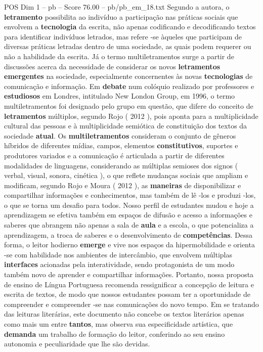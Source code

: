\begin{textsample}{POS Dim 1 – pb – Score 76.00 – pb/pb\_em\_18.txt}
Segundo a autora, o \textbf{letramento} possibilita ao indivíduo a participação nas práticas sociais que envolvem a \textbf{tecnologia} da escrita, não apenas codificando e decodificando textos para identificar indivíduos letrados, mas refere -se àqueles que participam de diversas práticas letradas dentro de uma sociedade, as quais podem requerer ou não a habilidade da escrita.
Já o termo multiletramentos surge a partir de discussões acerca da necessidade de considerar os novos \textbf{letramentos} \textbf{emergentes} na sociedade, especialmente concernentes às novas \textbf{tecnologias} de comunicação e informação.
Em \textbf{debate} num colóquio realizado por professores e \textbf{estudiosos} em Londres, intitulado New London Group, em 1996, o termo multiletramentos foi designado pelo grupo em questão, que difere do conceito de \textbf{letramentos} múltiplos, segundo Rojo ( 2012 ), pois aponta para a multiplicidade cultural das pessoas e à multiplicidade semiótica de constituição dos textos da sociedade \textbf{atual}.
Os \textbf{multiletramentos} consideram o conjunto de gêneros híbridos de diferentes mídias, campos, elementos \textbf{constitutivos}, suportes e produtores variados e a comunicação é articulada a partir de diferentes modalidades de linguagens, considerando as múltiplas semioses dos signos ( verbal, visual, sonora, cinética ), o que reflete mudanças sociais que ampliam e modificam, segundo Rojo e Moura ( 2012 ), as \textbf{maneiras} de disponibilizar e compartilhar informações e conhecimentos, mas também de lê -los e produzi -los, o que se torna um desafio para todos.
Nosso perfil de estudantes mudou e hoje a aprendizagem se efetiva também em espaços de difusão e acesso a informações e saberes que abrangem não apenas a sala de \textbf{aula} e a escola, o que potencializa a aprendizagem, a troca de saberes e o desenvolvimento de \textbf{competências}.
Dessa forma, o leitor hodierno \textbf{emerge} e vive nos espaços da hipermobilidade e orienta -se com habilidade nos ambientes de intercâmbio, que envolvem múltiplas \textbf{interfaces} acionadas pela interatividade, sendo protagonista de um modo também novo de aprender e compartilhar informações.
Portanto, nossa proposta de ensino de Língua Portuguesa recomenda ressignificar a concepção de leitura e escrita de textos, de modo que nossos estudantes possam ter a oportunidade de compreender e compreender -se nas comunicações do novo tempo.
Em se tratando das leituras literárias, este documento não concebe os textos literários apenas como mais um entre \textbf{tantos}, mas observa sua especificidade artística, que \textbf{demanda} um trabalho de formação do leitor, conferindo ao seu ensino autonomia e peculiaridade que lhe são devidas.

\end{textsample}
